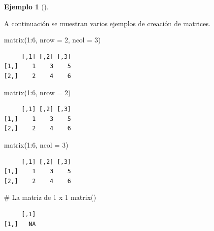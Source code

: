 \documentclass[
  a4paper,
]{scrreport}
\newenvironment{Shaded}{\begin{snugshade}}{\end{snugshade}}
\newcommand{\AttributeTok}[1]{\textcolor[rgb]{0.40,0.45,0.13}{#1}}
\newcommand{\CommentTok}[1]{\textcolor[rgb]{0.37,0.37,0.37}{#1}}
\newcommand{\DecValTok}[1]{\textcolor[rgb]{0.68,0.00,0.00}{#1}}
\newcommand{\FunctionTok}[1]{\textcolor[rgb]{0.28,0.35,0.67}{#1}}
\newcommand{\NormalTok}[1]{\textcolor[rgb]{0.00,0.23,0.31}{#1}}
\newcommand{\SpecialCharTok}[1]{\textcolor[rgb]{0.37,0.37,0.37}{#1}}
\theoremstyle{definition}
\theoremstyle{definition}
\newtheorem{example}{Ejemplo}[chapter]
\theoremstyle{remark}
\begin{document}
\leavevmode{}%
\begin{example}[]\label{exm-creacion-matrices}

A continuación se muestran varios ejemplos de creación de matrices.

\begin{Shaded}
\begin{Highlighting}[]
\FunctionTok{matrix}\NormalTok{(}\DecValTok{1}\SpecialCharTok{:}\DecValTok{6}\NormalTok{, }\AttributeTok{nrow =} \DecValTok{2}\NormalTok{, }\AttributeTok{ncol =} \DecValTok{3}\NormalTok{)}
\end{Highlighting}
\end{Shaded}

\begin{verbatim}
     [,1] [,2] [,3]
[1,]    1    3    5
[2,]    2    4    6
\end{verbatim}

\begin{Shaded}
\begin{Highlighting}[]
\FunctionTok{matrix}\NormalTok{(}\DecValTok{1}\SpecialCharTok{:}\DecValTok{6}\NormalTok{, }\AttributeTok{nrow =} \DecValTok{2}\NormalTok{)}
\end{Highlighting}
\end{Shaded}

\begin{verbatim}
     [,1] [,2] [,3]
[1,]    1    3    5
[2,]    2    4    6
\end{verbatim}

\begin{Shaded}
\begin{Highlighting}[]
\FunctionTok{matrix}\NormalTok{(}\DecValTok{1}\SpecialCharTok{:}\DecValTok{6}\NormalTok{, }\AttributeTok{ncol =} \DecValTok{3}\NormalTok{)}
\end{Highlighting}
\end{Shaded}

\begin{verbatim}
     [,1] [,2] [,3]
[1,]    1    3    5
[2,]    2    4    6
\end{verbatim}

\begin{Shaded}
\begin{Highlighting}[]
\CommentTok{\# La matriz de 1 x 1 }
\FunctionTok{matrix}\NormalTok{()}
\end{Highlighting}
\end{Shaded}

\begin{verbatim}
     [,1]
[1,]   NA
\end{verbatim}

\end{example}
\end{document}
